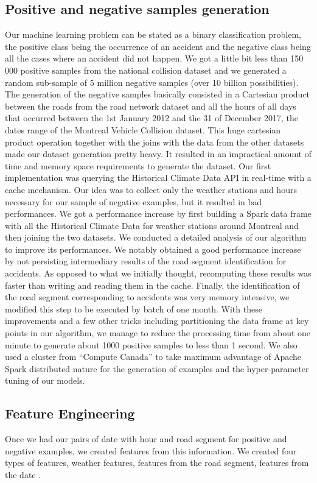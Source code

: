 \documentclass[conference]{IEEEtran}
\begin{document}
\subsection{Positive and negative samples generation}
Our machine learning problem can be stated as a binary classification problem, the positive class being the occurrence of an accident and the negative class being all the cases where an accident did not happen. We got a little bit less than 150 000 positive samples from the national collision dataset and we generated a random sub-sample of 5 million negative samples (over 10 billion possibilities). The generation of the negative samples basically consisted in a Cartesian product between the roads from the road network dataset and all the hours of all days that occurred between the 1st January 2012 and the 31 of December 2017, the dates range of the Montreal Vehicle Collision dataset. This huge cartesian product operation together with the joins with the data from the other datasets made our dataset generation pretty heavy. It resulted in an impractical amount of time and memory space requirements to generate the dataset. Our first implementation was querying the Historical Climate Data API in real-time with a cache mechanism. Our idea was to collect only the weather stations and hours necessary for our sample of negative examples, but it resulted in bad performances. We got a performance increase by first building a Spark data frame with all the Historical Climate Data for weather stations around Montreal and then joining the two datasets. We conducted a detailed analysis of our algorithm to improve its performances. We notably obtained a good performance increase by not persisting intermediary results of the road segment identification for accidents. As opposed to what we initially thought, recomputing these results was faster than writing and reading them in the cache. Finally, the identification of the road segment corresponding to accidents was very memory intensive, we modified this step to be executed by batch of one month.  With these improvements and a few other tricks including partitioning the data frame at key points in our algorithm, we manage to reduce the processing time from about one minute to generate about 1000 positive samples to less than 1 second. We also used a cluster from “Compute Canada” to take maximum advantage of Apache Spark distributed nature for the generation of examples and the hyper-parameter tuning of our models.

\subsection{Feature Engineering}
Once we had our pairs of date with hour and road segment for positive and negative examples, we created features from this information. We created four types of features, weather features, features from the road segment, features from the date .
\end{document}
